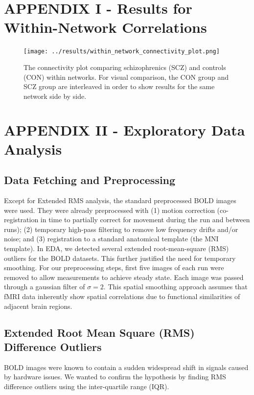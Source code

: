 \documentclass[11pt]{article}
\begin{document}


\newpage
\appendix

\section{APPENDIX I - Results for Within-Network Correlations}

\begin{figure}[H]
\centering
\texttt{[image: ../results/within\_network\_connectivity\_plot.png]}
\caption{The connectivity plot comparing schizophrenics (SCZ) and controls (CON) within networks. For visual comparison, the CON group and SCZ group are interleaved in order to show results for the same network side by side.}
\end{figure}

\section{APPENDIX II - Exploratory Data Analysis}

\subsection{Data Fetching and Preprocessing}

Except for Extended RMS analysis, the standard preprocessed BOLD images were used. They were already preprocessed with (1) motion correction (co-registration in time to partially correct for movement during the run and between runs); (2) temporary high-pass filtering to remove low frequency drifts and/or noise; and (3) registration to a standard anatomical template (the MNI template). In EDA, we detected several extended root-mean-square (RMS) outliers for the BOLD datasets. This further justified the need for temporary smoothing. For our preprocessing steps, first five images of each run were removed to allow measurements to achieve steady state. Each image was passed through a gaussian filter of $\sigma=2$. This spatial smoothing approach assumes that fMRI data inherently show spatial correlations due to functional similarities of adjacent brain regions.
\subsection{Extended Root Mean Square (RMS) Difference Outliers}

BOLD images were known to contain a sudden widespread shift in signals caused by hardware issues. We
wanted to confirm the hypothesis by finding RMS difference outliers using the inter-quartile range (IQR).
\end{document}
